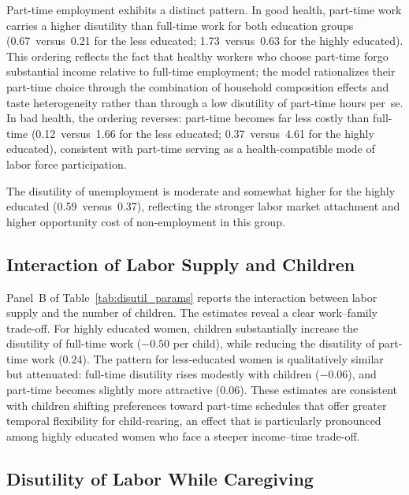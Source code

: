 Part-time employment exhibits a distinct pattern.  In good health,
part-time work carries a higher disutility than full-time work for both
education groups (0.67~versus~0.21 for the less educated; 1.73~versus~0.63
for the highly educated).  This ordering reflects the fact that healthy
workers who choose part-time forgo substantial income relative to full-time
employment; the model rationalizes their part-time choice through the
combination of household composition effects and taste heterogeneity
rather than through a low disutility of part-time hours per~se.  In bad
health, the ordering reverses: part-time becomes far less costly than
full-time (0.12~versus~1.66 for the less educated; 0.37~versus~4.61 for
the highly educated), consistent with part-time serving as a
health-compatible mode of labor force participation.

The disutility of unemployment is moderate and somewhat higher for the
highly educated (0.59~versus~0.37), reflecting the stronger labor market
attachment and higher opportunity cost of non-employment in this group.


\subsection{Interaction of Labor Supply and Children}
\label{sec:results_children}

Panel~B of Table~\ref{tab:disutil_params} reports the interaction between
labor supply and the number of children.  The estimates reveal a clear
work--family trade-off.  For highly educated women, children substantially
increase the disutility of full-time work ($-0.50$ per child), while
reducing the disutility of part-time work ($0.24$).  The pattern for
less-educated women is qualitatively similar but attenuated: full-time
disutility rises modestly with children ($-0.06$), and part-time becomes
slightly more attractive ($0.06$).  These estimates are consistent with
children shifting preferences toward part-time schedules that offer
greater temporal flexibility for child-rearing, an effect that is
particularly pronounced among highly educated women who face a steeper
income--time trade-off.


\subsection{Disutility of Labor While Caregiving}
\label{sec:results_disutil_care}

